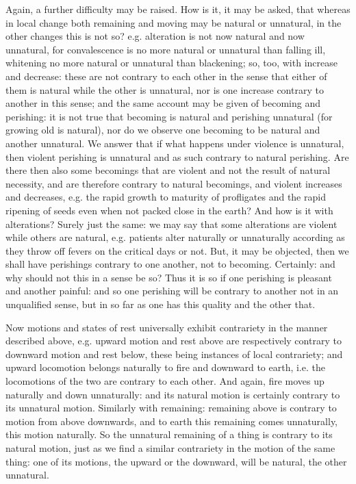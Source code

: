 Again, a further difficulty may be raised. How is it, it may be asked,
that whereas in local change both remaining and moving may be natural
or unnatural, in the other changes this is not so? e.g. alteration
is not now natural and now unnatural, for convalescence is no more
natural or unnatural than falling ill, whitening no more natural or
unnatural than blackening; so, too, with increase and decrease: these
are not contrary to each other in the sense that either of them is
natural while the other is unnatural, nor is one increase contrary
to another in this sense; and the same account may be given of becoming
and perishing: it is not true that becoming is natural and perishing
unnatural (for growing old is natural), nor do we observe one becoming
to be natural and another unnatural. We answer that if what happens
under violence is unnatural, then violent perishing is unnatural and
as such contrary to natural perishing. Are there then also some becomings
that are violent and not the result of natural necessity, and are
therefore contrary to natural becomings, and violent increases and
decreases, e.g. the rapid growth to maturity of profligates and the
rapid ripening of seeds even when not packed close in the earth? And
how is it with alterations? Surely just the same: we may say that
some alterations are violent while others are natural, e.g. patients
alter naturally or unnaturally according as they throw off fevers
on the critical days or not. But, it may be objected, then we shall
have perishings contrary to one another, not to becoming. Certainly:
and why should not this in a sense be so? Thus it is so if one perishing
is pleasant and another painful: and so one perishing will be contrary
to another not in an unqualified sense, but in so far as one has this
quality and the other that. 

Now motions and states of rest universally exhibit contrariety in
the manner described above, e.g. upward motion and rest above are
respectively contrary to downward motion and rest below, these being
instances of local contrariety; and upward locomotion belongs naturally
to fire and downward to earth, i.e. the locomotions of the two are
contrary to each other. And again, fire moves up naturally and down
unnaturally: and its natural motion is certainly contrary to its unnatural
motion. Similarly with remaining: remaining above is contrary to motion
from above downwards, and to earth this remaining comes unnaturally,
this motion naturally. So the unnatural remaining of a thing is contrary
to its natural motion, just as we find a similar contrariety in the
motion of the same thing: one of its motions, the upward or the downward,
will be natural, the other unnatural. 

